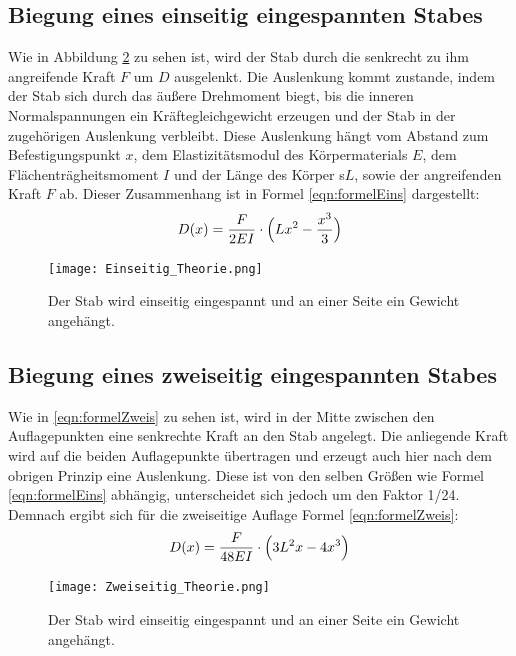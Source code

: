 \documentclass[titlepage = firstcover]{scrartcl}
\begin{document}
        \subsection{Biegung eines einseitig eingespannten Stabes}
          Wie in Abbildung \ref{fig:theorieEins} zu sehen ist, wird der Stab durch die senkrecht zu ihm angreifende Kraft $F$ um $D$ 
          ausgelenkt. Die Auslenkung kommt zustande, indem der Stab sich durch das äußere Drehmoment biegt, bis die 
          inneren Normalspannungen ein Kräftegleichgewicht erzeugen und der Stab in der zugehörigen Auslenkung verbleibt.
          Diese Auslenkung hängt vom Abstand zum Befestigungspunkt $x$, dem Elastizitätsmodul des Körpermaterials $E$, 
          dem Flächenträgheitsmoment $I$ und der Länge des Körper s$L$, sowie der angreifenden Kraft $F$ ab. Dieser 
          Zusammenhang ist in Formel \eqref{eqn:formelEins} dargestellt:
          \begin{equation}
            D(x) = \frac{F}{2EI} \cdot \Bigl(Lx^2 - \frac{x^3}{3}\Bigr)
            \label{eqn:formelEins}
          \end{equation}

          \begin{figure}[h]
            \centering
            \texttt{[image: Einseitig\_Theorie.png]}
            \caption{Der Stab wird einseitig eingespannt und an einer Seite ein Gewicht angehängt.}
            \label{fig:theorieEins}
          \end{figure}
      
        \subsection{Biegung eines zweiseitig eingespannten Stabes}
          Wie in \ref{eqn:formelZweis} zu sehen ist, wird in der Mitte zwischen den Auflagepunkten eine senkrechte Kraft an
          den Stab angelegt. Die anliegende Kraft wird auf die beiden Auflagepunkte übertragen und erzeugt auch hier nach 
          dem obrigen Prinzip eine Auslenkung. Diese ist von den selben Größen wie Formel \eqref{eqn:formelEins} abhängig, 
          unterscheidet sich jedoch um den Faktor 1/24. Demnach ergibt sich für die zweiseitige Auflage Formel 
          \eqref{eqn:formelZweis}:
          \begin{equation}
            D(x) = \frac{F}{48EI} \cdot \Bigl(3L^2x - 4x^3\Bigr)
            \label{eqn:formelZweis}
          \end{equation}

          \begin{figure}[h]
            \centering
            \texttt{[image: Zweiseitig\_Theorie.png]}
            \caption{Der Stab wird einseitig eingespannt und an einer Seite ein Gewicht angehängt.}
            \label{fig:theorieEins}
          \end{figure}
      
\end{document}

